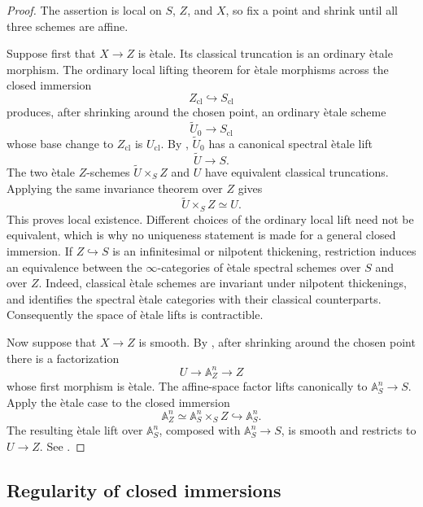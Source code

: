 \begin{proof}
The assertion is local on $S$, $Z$, and $X$, so fix a point and shrink
until all three schemes are affine.

Suppose first that $X\to Z$ is \`etale. Its classical truncation is an
ordinary \`etale morphism. The ordinary local lifting theorem for
\`etale morphisms across the closed immersion
\[
    Z_{\mathrm{cl}}
    \hookrightarrow
    S_{\mathrm{cl}}
\]
produces, after shrinking around the chosen point, an ordinary \`etale
scheme
\[
    \widetilde U_0
    \longrightarrow
    S_{\mathrm{cl}}
\]
whose base change to $Z_{\mathrm{cl}}$ is $U_{\mathrm{cl}}$. By
, $\widetilde U_0$ has a
canonical spectral \`etale lift
\[
    \widetilde U
    \longrightarrow
    S.
\]
The two \`etale $Z$-schemes $\widetilde U\times_SZ$ and $U$ have
equivalent classical truncations. Applying the same invariance theorem
over $Z$ gives
\[
    \widetilde U\times_SZ
    \simeq
    U.
\]
This proves local existence. Different choices of the ordinary local lift
need not be equivalent, which is why no uniqueness statement is made for
a general closed immersion. If $Z\hookrightarrow S$ is an infinitesimal or nilpotent
thickening, restriction induces an equivalence between the
$\infty$-categories of \`etale spectral schemes over $S$ and over $Z$.
Indeed, classical \`etale schemes are invariant under nilpotent
thickenings, and
identifies the spectral \`etale categories with their classical
counterparts. Consequently the space of \`etale lifts is contractible.

Now suppose that $X\to Z$ is smooth. By
, after shrinking around the chosen
point there is a factorization
\[
    U
    \longrightarrow
    \mathbb A_Z^n
    \longrightarrow
    Z
\]
whose first morphism is \`etale. The affine-space factor lifts
canonically to $\mathbb A_S^n\to S$. Apply the \`etale case to the closed
immersion
\[
    \mathbb A_Z^n
    \simeq
    \mathbb A_S^n\times_SZ
    \hookrightarrow
    \mathbb A_S^n.
\]
The resulting \`etale lift over $\mathbb A_S^n$, composed with
$\mathbb A_S^n\to S$, is smooth and restricts to $U\to Z$. See
\cite{LurieSAG,KhanBraveNewMotivicI}.
\end{proof}

\subsection{Regularity of closed immersions}

